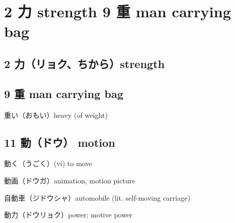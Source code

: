 \chapter{2 力 strength 9 重 man carrying bag}

\section{2 力（リョク、ちから）strength}

\section{9 重 man carrying bag}

重い（おもい）heavy (of weight)

\section{11 動（ドウ） motion}

動く（うごく）(vi) to move

動画（ドウガ）animation, motion picture

自動車（ジドウシャ）automobile (lit. self-moving carriage)

動力（ドウリョク）power; motive power
